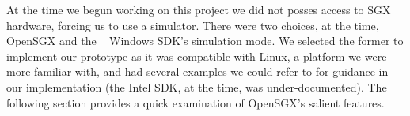 \documentclass[../main.tex]{subfiles}
\begin{document}
At the time we begun working on this project we did not posses access
to SGX hardware, forcing us to use a simulator. There were two
choices, at the time, OpenSGX and the \Intel~ Windows SDK's simulation
mode. We selected the former to implement our prototype as it was
compatible with Linux, a platform we were more familiar with, and had
several examples we could refer to for guidance in our implementation
(the Intel SDK, at the time, was under-documented). The following
section provides a quick examination of OpenSGX's salient features.
\end{document}

